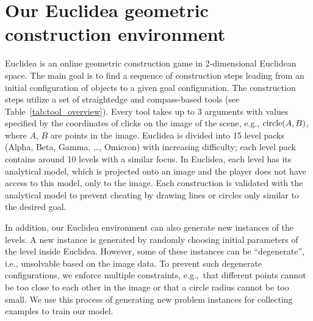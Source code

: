 \section{Our Euclidea geometric construction environment}
\label{sec:euclidea}

Euclidea is an online geometric construction game in 2-dimensional Euclidean space.
The main goal is to find a sequence of construction steps leading from an initial configuration of objects to a given goal configuration.
The construction steps utilize a set of straightedge and compass-based tools (see Table~\ref{tab:tool_overview}).
Every tool takes up to 3 arguments with values specified by the coordinates of clicks on the image of the scene, e.g., $\operatorname{circle}(A, B)$, where $A$, $B$ are points in the image.
Euclidea is divided into 15 level packs (Alpha, Beta, Gamma, \dots, Omicron) with increasing difficulty; each level pack contains around 10 levels with a similar focus.
In Euclidea, each level has its analytical model, which is projected onto an image and the player does not have access to this model, only to the image.
Each construction is validated with the analytical model to prevent cheating by drawing lines or circles only similar to the desired goal.

In addition, our Euclidea environment can also generate new instances of the levels.
A new instance is generated by randomly choosing initial parameters of the level inside Euclidea.
However, some of these instances can be ``degenerate'', i.e., unsolvable based on the image data.
To prevent such degenerate configurations, we enforce multiple constraints, e.g.,~that different points cannot be too close to each other in the image or that a circle radius cannot be too small.
We use this process of generating new problem instances for collecting examples to train our model.